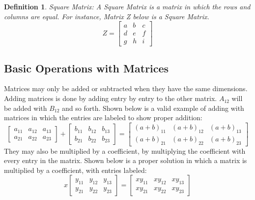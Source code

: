\documentclass[final,1p,12pt]{elsarticle}
\newtheorem{definition}{Definition}
\begin{document}
    \begin{definition}Square Matrix:
        A Square Matrix is a matrix in which the rows and columns are equal. For instance, Matrix Z below is a Square Matrix.
        \begin{equation*}%
            Z =
            \begin{bmatrix}
                a & b & c\\
                d & e & f\\
                g & h & i
            \end{bmatrix}
        \end{equation*}
    \end{definition}
        
    \subsection{Basic Operations with Matrices}
        Matrices may only be added or subtracted when they have the same dimensions.
        Adding matrices is done by adding entry by entry to the other matrix.
        $A_{12}$ will be added with $B_{12}$ and so forth.
        Shown below is a valid example of adding with matrices in which the entries are labeled to show proper addition:
        \begin{equation*}
            \begin{bmatrix}
                a_{11} & a_{12} & a_{13} \\
                a_{21} & a_{22} & a_{23}
            \end{bmatrix}
            +
            \begin{bmatrix}
                b_{11} & b_{12} & b_{13} \\
                b_{21} & b_{22} & b_{23}
            \end{bmatrix}
            =
            \begin{bmatrix}
                (a+b)_{11} & (a+b)_{12} & (a+b)_{13} \\
                (a+b)_{21} & (a+b)_{22} & (a+b)_{23}
            \end{bmatrix}
        \end{equation*}
        They may also be multiplied by a coefficient, by multiplying the coefficient with every entry in the matrix.
        Shown below is a proper solution in which a matrix is multiplied by a coefficient, with entries labeled:
         \begin{equation*}
            x
            \begin{bmatrix}
                y_{11} & y_{12} & y_{13} \\
                y_{21} & y_{22} & y_{23}
            \end{bmatrix}
            =
            \begin{bmatrix}
                xy_{11} & xy_{12} & xy_{13} \\
                xy_{21} & xy_{22} & xy_{23}
            \end{bmatrix}
        \end{equation*}
        
\end{document}

